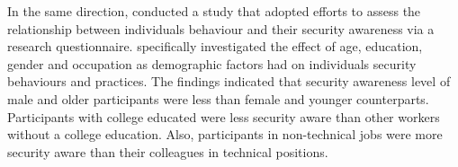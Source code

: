 In the same direction, \citet{Grant2010} conducted a study that adopted \citet{Katz2005} efforts to assess the relationship between individuals behaviour and their security awareness via a research questionnaire. \citet{Grant2010} specifically investigated the effect of age, education, gender and occupation as demographic factors had on individuals security behaviours and practices. The findings indicated that security awareness level of male and older participants were less than female and younger counterparts. Participants with college educated were less security aware than other workers without a college education. Also, participants in non-technical jobs were more security aware than their colleagues in technical positions. 


 

